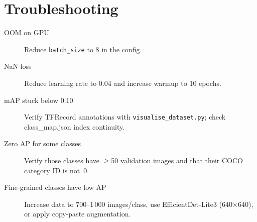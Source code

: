 \documentclass[11pt,a4paper]{article}
\begin{document}
\section{Troubleshooting}

\begin{description}
    \item[OOM on GPU] Reduce \texttt{batch\_size} to 8 in the config.
    \item[NaN loss] Reduce learning rate to 0.04 and increase warmup to 10 epochs.
    \item[mAP stuck below 0.10] Verify TFRecord annotations with
        \texttt{visualise\_dataset.py}; check class\_map.json index continuity.
    \item[Zero AP for some classes] Verify those classes have $\ge$50 validation
        images and that their COCO category ID is not~0.
    \item[Fine-grained classes have low AP] Increase data to 700--1\,000 images/class,
        use EfficientDet-Lite3 (640$\times$640), or apply copy-paste augmentation.
\end{description}

\end{document}
